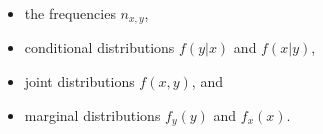 \documentclass[a4paper,12pt]{article}
\begin{document}
\begin{itemize}
	\item the frequencies $n_{x,y}$,
	\item conditional distributions $f(y|x)$ and $f(x|y)$,
	\item joint distributions $f(x,y)$, and
	\item marginal distributions $f_y(y)$ and $f_x(x)$.
\end{itemize}

	\begin{center}
		\begin{threeparttable}[htbp]
\label{tab:timeline}


\end{threeparttable}
\end{center}
\end{document}
